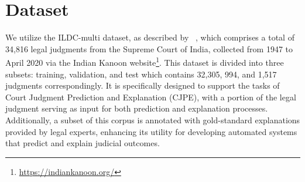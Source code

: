\section{Dataset}
We utilize the ILDC-multi dataset, as described by ~\cite{malik-etal-2021-ildc}, which comprises a total of 34,816 legal judgments from the Supreme Court of India, collected from 1947 to April 2020 via the Indian Kanoon website\footnote{\url{https://indiankanoon.org/}}. This dataset is divided into three subsets: training, validation, and test which contains 32,305, 994, and 1,517 judgments correspondingly. It is specifically designed to support the tasks of Court Judgment Prediction and Explanation (CJPE), with a portion of the legal judgment serving as input for both prediction and explanation processes. Additionally, a subset of this corpus is annotated with gold-standard explanations provided by legal experts, enhancing its utility for developing automated systems that predict and explain judicial outcomes.




